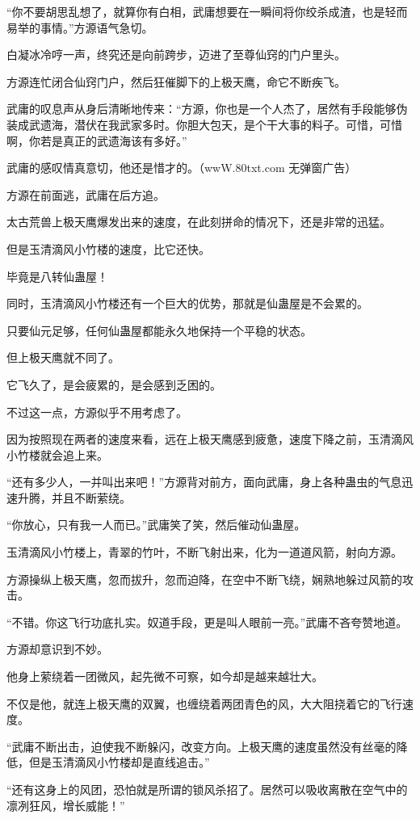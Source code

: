\begin{this_body}
“你不要胡思乱想了，就算你有白相，武庸想要在一瞬间将你绞杀成渣，也是轻而易举的事情。”方源语气急切。

白凝冰冷哼一声，终究还是向前跨步，迈进了至尊仙窍的门户里头。

方源连忙闭合仙窍门户，然后狂催脚下的上极天鹰，命它不断疾飞。

武庸的叹息声从身后清晰地传来：“方源，你也是一个人杰了，居然有手段能够伪装成武遗海，潜伏在我武家多时。你胆大包天，是个干大事的料子。可惜，可惜啊，你若是真正的武遗海该有多好。”

武庸的感叹情真意切，他还是惜才的。（wwW.80txt.com 无弹窗广告）

方源在前面逃，武庸在后方追。

太古荒兽上极天鹰爆发出来的速度，在此刻拼命的情况下，还是非常的迅猛。

但是玉清滴风小竹楼的速度，比它还快。

毕竟是八转仙蛊屋！

同时，玉清滴风小竹楼还有一个巨大的优势，那就是仙蛊屋是不会累的。

只要仙元足够，任何仙蛊屋都能永久地保持一个平稳的状态。

但上极天鹰就不同了。

它飞久了，是会疲累的，是会感到乏困的。

不过这一点，方源似乎不用考虑了。

因为按照现在两者的速度来看，远在上极天鹰感到疲惫，速度下降之前，玉清滴风小竹楼就会追上来。

“还有多少人，一并叫出来吧！”方源背对前方，面向武庸，身上各种蛊虫的气息迅速升腾，并且不断萦绕。

“你放心，只有我一人而已。”武庸笑了笑，然后催动仙蛊屋。

玉清滴风小竹楼上，青翠的竹叶，不断飞射出来，化为一道道风箭，射向方源。

方源操纵上极天鹰，忽而拔升，忽而迫降，在空中不断飞绕，娴熟地躲过风箭的攻击。

“不错。你这飞行功底扎实。奴道手段，更是叫人眼前一亮。”武庸不吝夸赞地道。

方源却意识到不妙。

他身上萦绕着一团微风，起先微不可察，如今却是越来越壮大。

不仅是他，就连上极天鹰的双翼，也缠绕着两团青色的风，大大阻挠着它的飞行速度。

“武庸不断出击，迫使我不断躲闪，改变方向。上极天鹰的速度虽然没有丝毫的降低，但是玉清滴风小竹楼却是直线追击。”

“还有这身上的风团，恐怕就是所谓的锁风杀招了。居然可以吸收离散在空气中的凛冽狂风，增长威能！”


\end{this_body}
